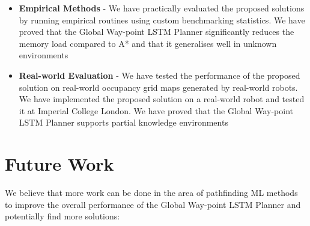 \begin{itemize}
\begin{itemize}
        \item \textbf{Empirical Methods} - We have practically evaluated the proposed solutions by running empirical routines using custom benchmarking statistics. We have proved that the Global Way-point LSTM Planner significantly reduces the memory load compared to A* and that it generalises well in unknown environments
        \item \textbf{Real-world Evaluation} - We have tested the performance of the proposed solution on real-world occupancy grid maps generated by real-world robots. We have implemented the proposed solution on a real-world robot and tested it at Imperial College London. We have proved that the Global Way-point LSTM Planner supports partial knowledge environments
    \end{itemize}
\end{itemize}


\section{Future Work}


We believe that more work can be done in the area of pathfinding ML methods to improve the overall performance of the Global Way-point LSTM Planner and potentially find more solutions:

